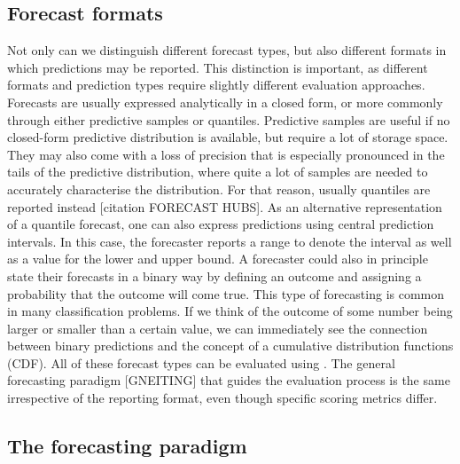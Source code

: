 \documentclass[article]{jss}
\begin{document}
\subsection{Forecast formats}

Not only can we distinguish different forecast types, but also different formats in which predictions may be reported. This distinction is important, as different formats and prediction types require slightly different evaluation approaches. Forecasts are usually expressed analytically in a closed form, or more commonly through either predictive samples or quantiles. Predictive samples are useful if no closed-form predictive distribution is available, but require a lot of storage space. They may also come with a loss of precision that is especially pronounced in the tails of the predictive distribution, where quite a lot of samples are needed to accurately characterise the distribution. For that reason, usually quantiles are reported instead [citation FORECAST HUBS]. As an alternative representation of a quantile forecast, one can also express predictions using central prediction intervals. In this case, the forecaster reports a range to denote the interval as well as a value for the lower and upper bound. A forecaster could also in principle state their forecasts in a binary way by defining an outcome and assigning a probability that the outcome will come true. This type of forecasting is common in many classification problems. If we think of the outcome of some number being larger or smaller than a certain value, we can immediately see the connection between binary predictions and the concept of a cumulative distribution functions (CDF). All of these forecast types can be evaluated using . The general forecasting paradigm [GNEITING] that guides the evaluation process is the same irrespective of the reporting format, even though specific scoring metrics differ. 

\subsection{The forecasting paradigm}
\end{document}
